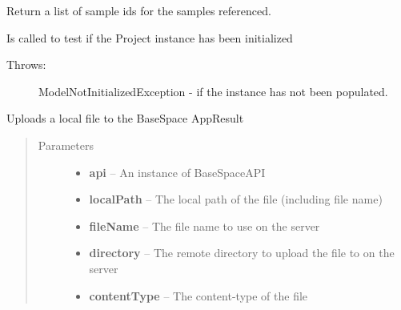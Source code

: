 \documentclass[letterpaper,10pt,english]{sphinxmanual}
\begin{document}
\begin{fulllineitems}
\begin{fulllineitems}
\end{fulllineitems}


\begin{fulllineitems}
\label{Available modules:BaseSpacePy.model.AppResult.AppResult.getReferencedSamplesIds}
Return a list of sample ids for the samples referenced.

\end{fulllineitems}


\begin{fulllineitems}
\label{Available modules:BaseSpacePy.model.AppResult.AppResult.isInit}
Is called to test if the Project instance has been initialized
\begin{description}
\item[{Throws:}] \leavevmode
ModelNotInitializedException  - if the instance has not been populated.

\end{description}

\end{fulllineitems}


\begin{fulllineitems}
\label{Available modules:BaseSpacePy.model.AppResult.AppResult.uploadFile}
Uploads a local file to the BaseSpace AppResult
\begin{quote}\begin{description}
\item[{Parameters}] \leavevmode\begin{itemize}
\item {} 
\textbf{api} -- An instance of BaseSpaceAPI

\item {} 
\textbf{localPath} -- The local path of the file (including file name)

\item {} 
\textbf{fileName} -- The file name to use on the server

\item {} 
\textbf{directory} -- The remote directory to upload the file to on the server

\item {} 
\textbf{contentType} -- The content-type of the file

\end{itemize}

\end{description}\end{quote}

\end{fulllineitems}


\end{fulllineitems}
\end{document}
